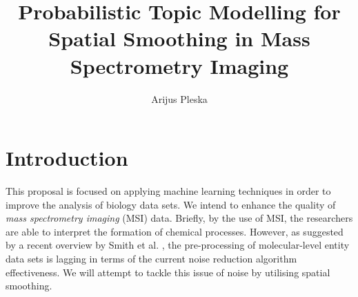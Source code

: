 \documentclass{mprop}
\begin{document}
\title{Probabilistic Topic Modelling for Spatial Smoothing in Mass Spectrometry Imaging}
\author{Arijus Pleska}
\maketitle

\tableofcontents
\newpage


\section{Introduction}






\par This proposal is focused on applying machine learning techniques in order to improve the analysis of biology data sets. We intend to enhance the quality of \textit{mass spectrometry imaging} (MSI) data. Briefly, by the use of MSI, the researchers are able to interpret the formation of chemical processes. However, as suggested by a recent overview by Smith et al. \cite{smith_2004}, the pre-processing of molecular-level entity data sets is lagging in terms of the current noise reduction algorithm effectiveness. We will attempt to tackle this issue of noise by utilising spatial smoothing. 
  

\end{document}
